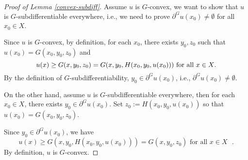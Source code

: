 \documentclass[a4paper, 11pt]{amsart}
\numberwithin{equation}{section}
\theoremstyle{plain}
\theoremstyle{definition}
\theoremstyle{remark}
\begin{document}
\begin{proof}[Proof of Lemma \ref{convex-subdiff}]
%
%
%
%
%

	Assume $u$ is $G$-convex, we want to show that $u$ is $G$-subdifferentiable everywhere, i.e., we need to prove  $\partial^G u(x_0)\neq \emptyset$ for all $x_0\in X$.
	
	Since $u$ is $G$-convex, by definition, for each $x_0$, there exists $ y_0, z_0$ such that $u(x_0) = G(x_0,y_0,z_0)$ and
	\begin{equation*}
	u(x)\ge G(x, y_0, z_0) = G(x, y_0, H(x_0,y_0,u(x_0))) \text{  for all  $ x \in X$}.
	\end{equation*}
	By the definition of $G$-subdifferentiability, $y_0 \in \partial^G u(x_0)$, i.e., $\partial^G u(x_0) \neq \emptyset$.
	
	On the other hand, assume $u$ is $G$-subdifferentiable everywhere, then for each $ x_0 \in X$,  there exists $ y_0 \in \partial^G u(x_0)$. Set $z_0:=H(x_0,y_0,u(x_0))$ so that $u(x_0) = G(x_0, y_0, z_0)$.
	
	Since $y_0\in \partial^G u(x_0)$, we have 
	\begin{equation*}
	u(x)\ge G(x,y_0,H(x_0,y_0,u(x_0))) = G(x,y_0,z_0) \text{  for all $x\in X$ }.
	\end{equation*}
	By definition, $u$ is $G$-convex.
\end{proof}
\end{document}
